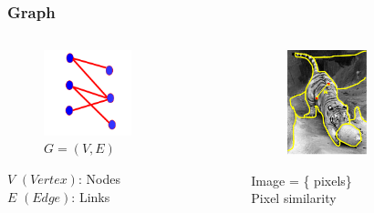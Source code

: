 \documentclass[notheorems,mathserif,table,compress]{beamer}  %
\begin{document}
\begin{frame}
   \frametitle{Graph}
    \begin{columns}
       \begin{column}[c]{0.45\textwidth}
          \begin{figure}[!ht]
          \centering
          \includegraphics[width=1.0in]{G_VE.png}\\
	  {\textbf{\huge $G=(V,E)$}}
          \end{figure}
         \hspace{0.3in} $V$ $(Vertex)$: Nodes \\
	  \hspace{0.3in} $E$ $(Edge)$: Links
       \end{column}

       \begin{column}[c]{0.55\textwidth}
          \begin{figure}[l]
          \centering
          \includegraphics[width=0.9in]{G_VE1.png}
          \end{figure}
      \hspace{0.4in} Image = \{ pixels\} \\
     \hspace{0.4in}  Pixel similarity
      \end{column}
    \end{columns}
\end{frame}
\end{document}
